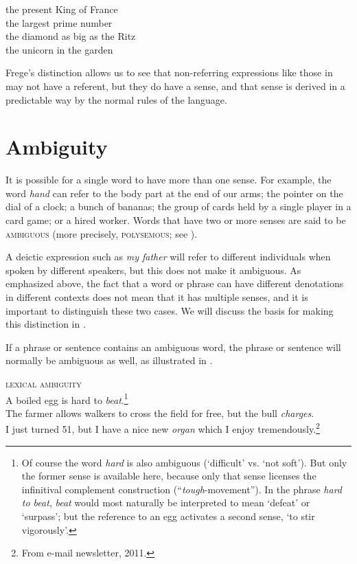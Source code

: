 \ea \label{ex:2.12}
\ea the present King of France\\
\ex the largest prime number\\
\ex the diamond as big as the Ritz\\
\ex the unicorn in the garden
                       \z
\z


Frege’s distinction allows us to see that non-referring expressions like those in  may not have a referent, but they do have a sense, and that sense is derived in a predictable way by the normal rules of the language.


\section{Ambiguity}\label{sec:2.5}

It is possible for a single word to have more than one sense. For example, the word \textit{hand} can refer to the body part at the end of our arms; the pointer on the dial of a clock; a bunch of bananas; the group of cards held by a single player in a card game; or a hired worker. Words that have two or more senses are said to be \textsc{ambiguous} (more precisely, \textsc{polysemous}; see ).



A deictic expression such as \textit{my father} will refer to different individuals when spoken by different speakers, but this does not make it ambiguous. As emphasized above, the fact that a word or phrase can have different denotations in different contexts does not mean that it has multiple senses, and it is important to distinguish these two cases. We will discuss the basis for making this distinction in .



If a phrase or sentence contains an ambiguous word, the phrase or sentence will normally be ambiguous as well, as illustrated in .


\ea \label{ex:2.13}
\textsc{lexical ambiguity}\\
\ea A boiled egg is hard to \textit{beat}.\footnote{Of course the word \textit{hard} is also ambiguous (‘difficult’ vs. ‘not soft’). But only the former sense is available here, because only that sense licenses the infinitival complement construction (“\textit{tough}-movement”). In the phrase \textit{hard to beat}, \textit{beat} would most naturally be interpreted to mean ‘defeat’ or ‘surpass’; but the reference to an egg activates a second sense, ‘to stir vigorously’.}\\
\ex The farmer allows walkers to cross the field for free, but the bull \textit{charges}.\\
\ex I just turned 51, but I have a nice new \textit{organ} which I enjoy tremendously.\footnote{From e-mail newsletter, 2011.}
                       \z
\z


